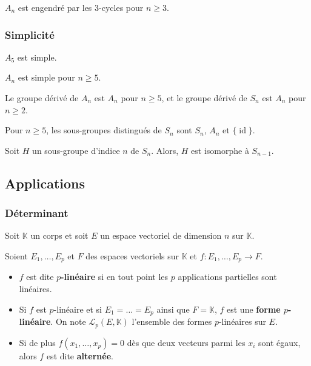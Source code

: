 	\begin{proposition}
		$A_n$ est engendré par les $3$-cycles pour $n \geq 3$.
	\end{proposition}

	\subsubsection{Simplicité}


	\begin{lemma}
		$A_5$ est simple.
	\end{lemma}


	\begin{theorem}
		$A_n$ est simple pour $n \geq 5$.
	\end{theorem}

	\begin{corollary}
		Le groupe dérivé de $A_n$ est $A_n$ pour $n \geq 5$, et le groupe dérivé de $S_n$ est $A_n$ pour $n \geq 2$.
	\end{corollary}

	\begin{corollary}
		Pour $n \geq 5$, les sous-groupes distingués de $S_n$ sont $S_n$, $A_n$ et $\{ \operatorname{id} \}$.
	\end{corollary}

	\begin{corollary}
		Soit $H$ un sous-groupe d'indice $n$ de $S_n$. Alors, $H$ est isomorphe à $S_{n-1}$.
	\end{corollary}

	\subsection{Applications}

	\subsubsection{Déterminant}


	Soit $\mathbb{K}$ un corps et soit $E$ un espace vectoriel de dimension $n$ sur $\mathbb{K}$.

	\begin{definition}
		Soient $E_1, \dots, E_p$ et $F$ des espaces vectoriels sur $\mathbb{K}$ et $f : E_1, \dots, E_p \rightarrow F$.
		\begin{itemize}
			\item $f$ est dite \textbf{$p$-linéaire} si en tout point les $p$ applications partielles sont linéaires.
			\item Si $f$ est $p$-linéaire et si $E_1 = \dots = E_p$ ainsi que $F = \mathbb{K}$, $f$ est une \textbf{forme $p$-linéaire}. On note $\mathcal{L}_p(E, \mathbb{K})$ l'ensemble des formes $p$-linéaires sur $E$.
			\item Si de plus $f(x_1, \dots, x_p) = 0$ dès que deux vecteurs parmi les $x_i$ sont égaux, alors $f$ est dite \textbf{alternée}.
		\end{itemize}
	\end{definition}

